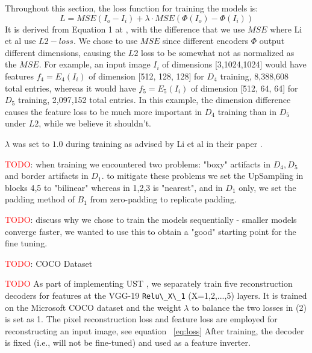 Throughout this section, the loss function for training the models is:
\begin{equation}\label{eq:loss}
L = MSE(I_o-I_i) + \lambda \cdot MSE(\Phi(I_o)-\Phi(I_i))
\end{equation}
It is derived from Equation 1 at \cite{bib11}, with the difference that we use $MSE$ where Li et al use $L2 -loss$. We chose to use $MSE$ since different encoders $\Phi$ output different dimensions, causing the $L2$ loss to be  somewhat not as normalized as the $MSE$. For example, an input image $I_i$ of dimensions [3,1024,1024] would have features $f_4=E_4(I_i)$ of dimension [512, 128, 128] for $D_4$ training, 8,388,608 total entries, whereas it would have $f_5=E_5(I_i)$ of dimension [512, 64, 64] for $D_5$ training, 2,097,152 total entries. In this example, the dimension difference causes the feature loss to be much more important in $D_4$ training than in $D_5$ under $L2$, while we believe it shouldn't.

$\lambda$ was set to $1.0$ during training as advised by Li et al in their paper \cite{bib11}.

\textcolor{red}{TODO}: when training we encountered two problems: "boxy" artifacts in $D_4, D_5$ and border artifacts in $D_1$. to mitigate these problems we set the UpSampling in blocks 4,5 to "bilinear" whereas in 1,2,3 is "nearest", and in $D_1$ only, we set the padding method of $B_1$ from zero-padding to replicate padding.

\textcolor{red}{TODO}: discuss why we chose to train the models sequentially - smaller models converge faster, we wanted to use this to obtain a "good" starting point for the fine tuning.

\textcolor{red}{TODO}: COCO Dataset

\textcolor{red}{TODO} As part of implementing UST \cite{bib11}, we separately train five reconstruction decoders for features at the VGG-19 \verb|Relu\_X\_1| (X=1,2,...,5) layers. It is trained on the Microsoft COCO dataset \cite{bib10} and the weight $\lambda$ to balance the two losses in (2) is set as 1. The pixel reconstruction loss \cite{bib22} and feature loss \cite{bib22, bib17} are employed for reconstructing an input image, see equation ~\ref{eq:loss} After training, the decoder is fixed (i.e., will not be fine-tuned) and used as a feature inverter.